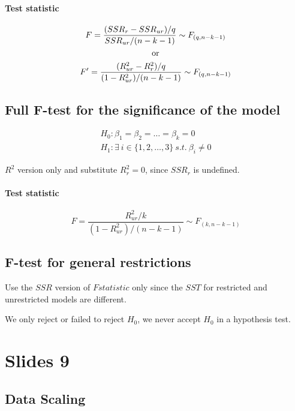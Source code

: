 \documentclass[]{article}
\begin{document}
    	\paragraph{Test statistic}
    	\begin{gather*}
    		F = \frac{(SSR_r - SSR_{ur})/q}{SSR_{ur}/(n-k-1)} \sim F_{(q, n-k-1)} \\
    		\text{{or}} \\
    		F' = \frac{(R^2_{ur} - R^2_r)/q}{(1-R^2_{ur})/(n-k-1)} \sim F_{(q, n-k-1)}
    	\end{gather*}
    	
    	\subsection{Full F-test for the significance of the model}
    	\begin{gather*}
    		H_0: \beta_1 = \beta_2 = \dots = \beta_k = 0 \\
    		H_1: \exists\ i \in \{1, 2, \dots ,3\}\ s.t.\ \beta_i \neq 0
    	\end{gather*}
    	\begin{remark}
    		$R^2$ version only and substitute $R^2_{r} = 0$, since $SSR_{r}$ is undefined.
    	\end{remark}
    	\paragraph{Test statistic}
    	\[
    		F = \frac{R^2_{ur}/k}{(1-R^2_{ur})/(n-k-1)} \sim F_{(k, n-k-1)}
    	\]
    	
    	\subsection{F-test for general restrictions}
    	\begin{remark}
    		Use the $SSR$ version of $Fstatistic$ only since the $SST$ for restricted and unrestricted models are different.
    	\end{remark}
    	\begin{remark}
    		We only reject or failed to reject $H_0$, we never accept $H_0$ in a hypothesis test.
    	\end{remark}
    	
    \section{Slides 9}
    	\subsection{Data Scaling}
\end{document}
